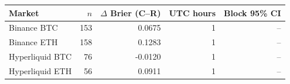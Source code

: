 \begin{tabular}{lrrrr}
\toprule
Market & $n$ & $\Delta$ Brier (C--R) & UTC hours & Block 95\% CI \\
\midrule
Binance BTC & 153 & 0.0675 & 1 & -- \\
Binance ETH & 158 & 0.1283 & 1 & -- \\
Hyperliquid BTC & 76 & -0.0120 & 1 & -- \\
Hyperliquid ETH & 56 & 0.0911 & 1 & -- \\
\bottomrule
\end{tabular}

